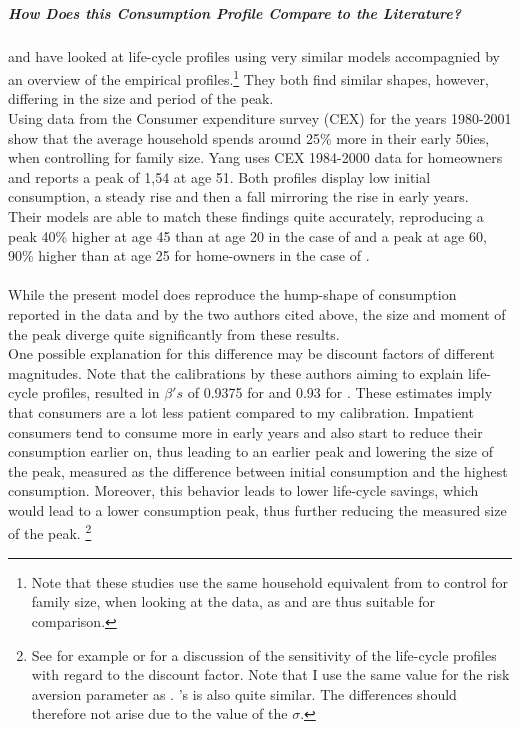 \documentclass[a4paper,12pt,legno]{article}
\begin{document}
\subparagraph{How Does this Consumption Profile Compare to the Literature?} \cite{FV&K2011} and \cite{yang2009} have looked at life-cycle profiles using very similar models accompagnied by an overview of the empirical profiles.\footnote{Note that these studies use the same household equivalent from \cite{fernandez2007consumption} to control for family size, when looking at the data, as \cite{hintermaier2011} and are thus suitable for comparison.} They both find similar shapes, however, differing in the size and period of the peak.\\
Using data from the Consumer expenditure survey (CEX) for the years 1980-2001 \cite{FV&K2011} show that the average household spends around 25\% more in their early 50ies, when controlling for family size. Yang uses CEX 1984-2000 data for homeowners and reports a peak of 1,54 at age 51. Both profiles display low initial consumption, a steady rise and then a fall mirroring the rise in early years. \\
Their models are able to match these findings quite accurately, reproducing a peak 40\% higher at age 45 than at age 20 in the case of \citep{FV&K2011} and a peak at age 60, 90\% higher than at age 25 for home-owners in the case of \cite{yang2009}. 
\\ \\
While the present model does reproduce the hump-shape of consumption reported in the data and by the two authors cited above, the size and moment of the peak diverge quite significantly from these results. \\
One possible explanation for this difference may be discount factors of different magnitudes. Note that the calibrations by these authors aiming to explain life-cycle profiles, resulted in $\beta 's$ of 0.9375 for \cite{FV&K2011} and 0.93 for \cite{yang2009}. These estimates imply that consumers are a lot less patient compared to my calibration. Impatient consumers tend to consume more in early years and also start to reduce their consumption earlier on, thus leading to an earlier peak and lowering the size of the peak, measured as the difference between initial consumption and the highest consumption. Moreover, this behavior leads to lower life-cycle savings, which would lead to a lower consumption peak, thus further reducing the measured size of the peak. \footnote{See for example \citep{Gourinchas&Parker2002} or \cite{cagetti2003} for a discussion of the sensitivity of the life-cycle profiles with regard to the discount factor. Note that I use the same value for the risk aversion parameter as \cite{yang2009}. \cite{FV&K2011}'s is also quite similar. The differences should therefore not arise due to the value of the $\sigma$.}
\end{document}
